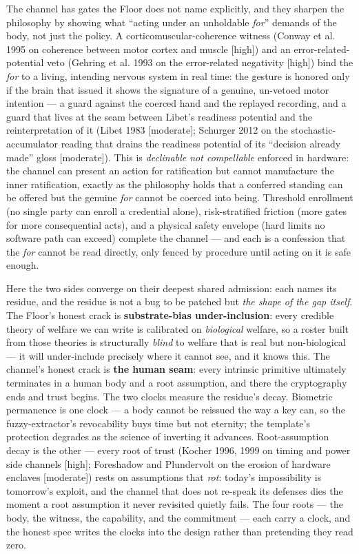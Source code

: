 \documentclass[11pt]{article}
\begin{document}
The channel has gates the Floor does not name explicitly, and they sharpen the philosophy by showing what ``acting under an unholdable \emph{for}'' demands of the body, not just the policy. A corticomuscular-coherence witness (Conway et al. 1995 on coherence between motor cortex and muscle [high]) and an error-related-potential veto (Gehring et al. 1993 on the error-related negativity [high]) bind the \emph{for} to a living, intending nervous system in real time: the gesture is honored only if the brain that issued it shows the signature of a genuine, un-vetoed motor intention — a guard against the coerced hand and the replayed recording, and a guard that lives at the seam between Libet's readiness potential and the reinterpretation of it (Libet 1983 [moderate]; Schurger 2012 on the stochastic-accumulator reading that drains the readiness potential of its ``decision already made'' gloss [moderate]). This is \emph{declinable not compellable} enforced in hardware: the channel can present an action for ratification but cannot manufacture the inner ratification, exactly as the philosophy holds that a conferred standing can be offered but the genuine \emph{for} cannot be coerced into being. Threshold enrollment (no single party can enroll a credential alone), risk-stratified friction (more gates for more consequential acts), and a physical safety envelope (hard limits no software path can exceed) complete the channel — and each is a confession that the \emph{for} cannot be read directly, only fenced by procedure until acting on it is safe enough.

Here the two sides converge on their deepest shared admission: each names its residue, and the residue is not a bug to be patched but \emph{the shape of the gap itself}. The Floor's honest crack is \textbf{substrate-bias under-inclusion}: every credible theory of welfare we can write is calibrated on \emph{biological} welfare, so a roster built from those theories is structurally \emph{blind} to welfare that is real but non-biological — it will under-include precisely where it cannot see, and it knows this. The channel's honest crack is \textbf{the human seam}: every intrinsic primitive ultimately terminates in a human body and a root assumption, and there the cryptography ends and trust begins. The two clocks measure the residue's decay. Biometric permanence is one clock — a body cannot be reissued the way a key can, so the fuzzy-extractor's revocability buys time but not eternity; the template's protection degrades as the science of inverting it advances. Root-assumption decay is the other — every root of trust (Kocher 1996, 1999 on timing and power side channels [high]; Foreshadow and Plundervolt on the erosion of hardware enclaves [moderate]) rests on assumptions that \emph{rot}: today's impossibility is tomorrow's exploit, and the channel that does not re-speak its defenses dies the moment a root assumption it never revisited quietly fails. The four roots — the body, the witness, the capability, and the commitment — each carry a clock, and the honest spec writes the clocks into the design rather than pretending they read zero.
\end{document}
